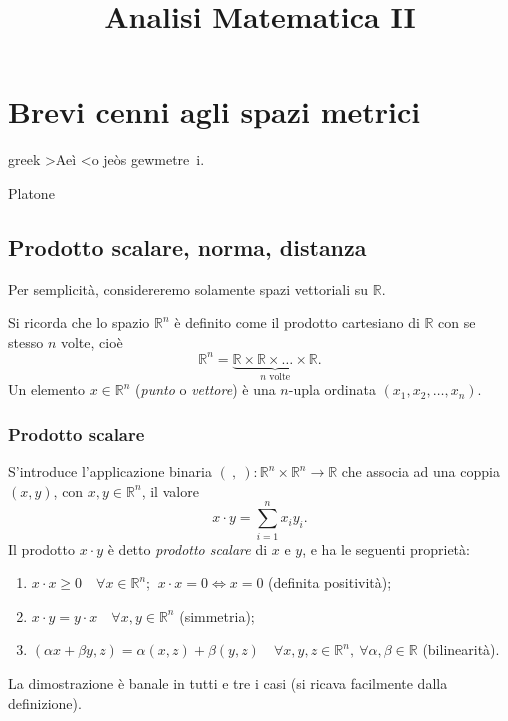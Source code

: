 \documentclass[a4paper]{book}
\numberwithin{equation}{section}
\theoremstyle{plain}
\theoremstyle{definition}
\theoremstyle{remark}
\theoremstyle{example}
\begin{document}
\title{Analisi Matematica II}

\author{}
\date{}

\maketitle

\tableofcontents

\chapter{Brevi cenni agli spazi metrici}

\epigraph{
\begin{otherlanguage*}{greek}
	>Ae\`{i} <o je\`{o}s gewmetre~i.
\end{otherlanguage*}
}{Platone}
\section{Prodotto scalare, norma, distanza}
Per semplicità, considereremo solamente spazi vettoriali su $\mathbb{R}$.

Si ricorda che lo spazio $\mathbb{R}^n$ è definito come il prodotto cartesiano di $\mathbb{R}$ con se stesso $n$ volte, cioè
\begin{equation}
	\mathbb{R}^n = \underbrace{\mathbb{R}\times \mathbb{R} \times \dots \times \mathbb{R}}_{n \text{ volte}}.
\end{equation}
Un elemento $x \in \mathbb{R}^n$ (\emph{punto} o \emph{vettore}) è una $n$-upla ordinata $(x_1, x_2, \dots, x_n)$.

\subsection{Prodotto scalare}
S'introduce l'applicazione binaria $(\ ,\ )\colon\mathbb{R}^n\times\mathbb{R}^n \to \mathbb{R}$ che associa ad una coppia $(x,y)$, con $x,y\in\mathbb{R}^n$, il valore
\begin{equation}
	\label{eqn:prodscal}
	x\cdot y = \sum_{i=1}^nx_iy_i.
\end{equation}
Il prodotto $x\cdot y$ è detto \emph{prodotto scalare} di $x$ e $y$, e ha le seguenti proprietà:
\begin{enumerate}[label=$\mathcal{S}$\arabic*.]
	\item \label{s1} $x\cdot x \ge 0 \quad \forall x\in \mathbb{R}^n$; $\ x\cdot x = 0 \iff x = 0$ (definita positività);
	\item \label{s2} $x\cdot y = y \cdot x \quad \forall x, y \in \mathbb{R}^n$ (simmetria);
	\item \label{s3} $(\alpha x + \beta y, z) = \alpha(x, z) + \beta(y, z) \quad \forall x,y,z \in \mathbb{R}^n,\ \forall \alpha, \beta \in \mathbb{R}$ (bilinearità).
\end{enumerate}
\proof La dimostrazione è banale in tutti e tre i casi (si ricava facilmente dalla definizione).
\endproof
\end{document}
